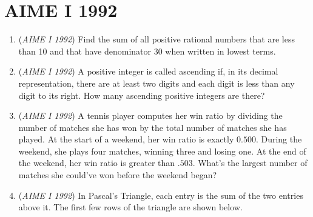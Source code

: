 \section{AIME I 1992}
        \begin{enumerate}
        	\item (\textit{AIME I 1992}) Find the sum of all positive rational numbers that are less than 10 and that have denominator 30 when written in lowest terms.


 

	\item (\textit{AIME I 1992}) A positive integer is called ascending if, in its decimal representation, there are at least two digits and each digit is less than any digit to its right. 
How many ascending positive integers are there?


 

	\item (\textit{AIME I 1992}) A tennis player computes her win ratio by dividing the number of matches she has won by the total number of matches she has played. At the start of a weekend, her win ratio is exactly $0.500$. During the weekend, she plays four matches, winning three and losing one. At the end of the weekend, her win ratio is greater than $.503$. What's the largest number of matches she could've won before the weekend began?


 

	\item (\textit{AIME I 1992}) In Pascal's Triangle, each entry is the sum of the two entries above it. The first few rows of the triangle are shown below.



\end{enumerate}
